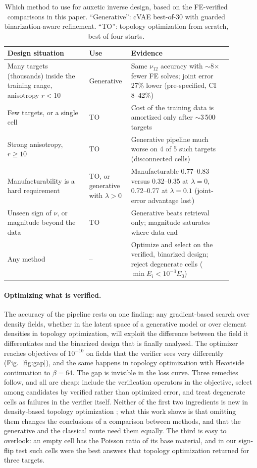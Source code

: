 \documentclass[a4paper,11pt]{article}
\newcommand{\nuot}{\nu_{12}}
\begin{document}
\begin{table}[t]
\centering
\caption{Which method to use for auxetic inverse design, based on the
FE-verified comparisons in this paper. ``Generative'': cVAE best-of-30 with
guarded binarization-aware refinement. ``TO'': topology optimization from
scratch, best of four starts.}
\label{tab:choice}
\small
\begin{tabular}{p{0.34\linewidth}p{0.14\linewidth}p{0.42\linewidth}}
\toprule
Design situation & Use & Evidence\\
\midrule
Many targets (thousands) inside the training range, anisotropy $r<10$
  & Generative & Same $\nuot$ accuracy with $\sim$8$\times$ fewer FE solves;
  joint error 27\% lower (pre-specified, CI 8--42\%)\\
Few targets, or a single cell
  & TO & Cost of the training data is amortized only after
  $\sim$3\,500 targets\\
Strong anisotropy, $r\ge10$
  & TO & Generative pipeline much worse on 4 of 5 such targets
  (disconnected cells)\\
Manufacturability is a hard requirement
  & TO, or generative with $\lambda>0$ & Manufacturable 0.77--0.83 versus
  0.32--0.35 at $\lambda=0$, 0.72--0.77 at $\lambda=0.1$ (joint-error
  advantage lost)\\
Unseen sign of $\nu$, or magnitude beyond the data
  & TO & Generative beats retrieval only; magnitude saturates where data
  end\\
Any method
  & -- & Optimize and select on the verified, binarized design; reject
  degenerate cells ($\min E_i<10^{-3}E_0$)\\
\bottomrule
\end{tabular}
\end{table}

\paragraph{Optimizing what is verified.}
The accuracy of the pipeline rests on one finding: any gradient-based search
over density fields, whether in the latent space of a generative model or
over element densities in topology optimization, will exploit the difference
between the field it differentiates and the binarized design that is finally
analysed. The optimizer reaches objectives of $10^{-10}$ on fields that the
verifier sees very differently (Fig.~\ref{fig:gap}), and the same happens in
topology optimization with Heaviside continuation to $\beta=64$. The gap is
invisible in the loss curve. Three remedies follow, and all are cheap:
include the verification operators in the objective, select among
candidates by verified rather than optimized error, and treat degenerate
cells as failures in the verifier itself. Neither of the first two
ingredients is new in density-based topology optimization
\citep{guest2004achieving,wang2011projection}; what this work shows is that
omitting them changes the conclusions of a comparison between methods, and
that the generative and the classical route need them equally. The third is
easy to overlook: an empty cell has the Poisson ratio of its base material,
and in our sign-flip test such cells were the best answers that topology
optimization returned for three targets.
\end{document}
